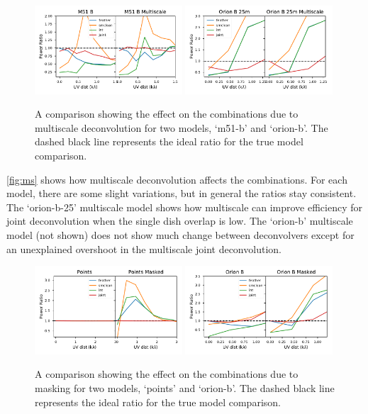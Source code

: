 \documentclass[manuscript,linenumbers]{aastex62}
\begin{document}
\begin{figure}[ht]
    \includegraphics[width=0.49\textwidth]{figures/M51-B-Multiscale}
    \includegraphics[width=0.49\textwidth]{figures/Orion-B-25m-Multiscale}
    \caption{A comparison showing the effect on the combinations due to multiscale deconvolution for two models, `m51-b' and `orion-b'. The dashed black line represents the ideal ratio for the true model comparison. }
    \label{fig:ms}
\end{figure}

\autoref{fig:ms} shows how multiscale deconvolution affects the combinations. For each model, there are some slight variations, but in general the ratios stay consistent. The `orion-b-25' multiscale model shows how multiscale can improve efficiency for joint deconvolution when the single dish overlap is low. The `orion-b' multiscale model (not shown) does not show much change between deconvolvers except for an unexplained overshoot in the multiscale joint deconvolution.

\begin{figure}[ht]
    \includegraphics[width=0.49\textwidth]{figures/Points-Masked}
    \includegraphics[width=0.49\textwidth]{figures/Orion-B-Masked}
    \caption{A comparison showing the effect on the combinations due to masking for two models, `points' and `orion-b'. The dashed black line represents the ideal ratio for the true model comparison. }
    \label{fig:masked}
\end{figure}
\end{document}
